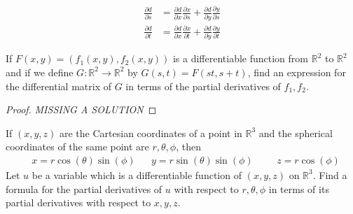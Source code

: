 \documentclass[12pt]{book}
\newcommand{\R}{\mathbb{R}}
\newenvironment{exercise}[2][Exercise]{\begin{trivlist}
\item[\hskip \labelsep {\bfseries #1}\hskip \labelsep {\bfseries #2.}]}{\end{trivlist}}
\begin{document}
\begin{exercise}{7.2.7}
\begin{exercise}{9.3.6}
    \begin{align*}
    \frac{\partial d}{\partial s} &= \frac{\partial d}{\partial x} \frac{\partial x}{\partial s} + \frac{\partial d}{\partial y} \frac{\partial y}{\partial s} \\
    \frac{\partial d }{\partial t} &= \frac{\partial d}{\partial x} \frac{\partial x}{\partial t} + \frac{\partial d }{\partial y} \frac{\partial y}{\partial t}
    \end{align*}
\end{exercise}



\begin{exercise}{9.3.8}
	If $F(x,y) = \left( f_1 (x,y), f_2 (x, y) \right)$ is a differentiable function from $\R^2$ to $\R^2$ and if we define $G: \R^2 \to \R^2$ by $G(s, t) = F(s t, s+t)$, find an expression for the differential matrix of $G$ in terms of the partial derivatives of $f_1, f_2$.

	\begin{proof}
	\emph{MISSING A SOLUTION}
	\end{proof}
\end{exercise}



\begin{exercise}{9.3.9}
	If $(x,y,z)$ are the Cartesian coordinates of a point in $\R^3$ and the spherical coordinates of the same point are $r, \theta, \phi$, then
		\begin{align*} &x = r \cos(\theta) \sin(\phi)  &&y = r \sin(\theta) \sin(\phi) &&&z = r \cos(\phi) \end{align*}
	Let $u$ be a variable which is a differentiable  function of $(x,y,z)$ on $\R^3$. Find a formula for the partial derivatives of $u$ with respect to $r, \theta, \phi$ in terms of its partial derivatives with respect to $x,y,z$.


\end{exercise}
\end{exercise}
\end{document}
